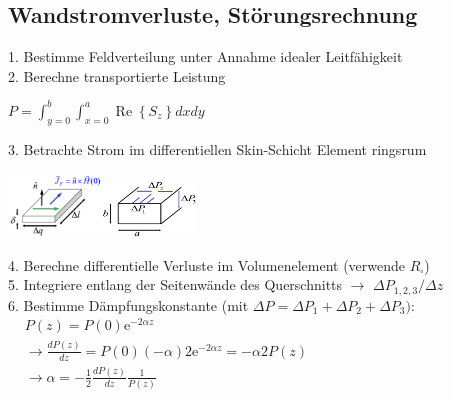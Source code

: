 \documentclass[english]{latex4ei/latex4ei_sheet}
\begin{document}
\begin{sectionbox}
	\subsection{Wandstromverluste, Störungsrechnung}
	1. Bestimme Feldverteilung unter Annahme idealer Leitfähigkeit\\
	2. Berechne transportierte Leistung\\
	\begin{emphbox}
		$P=\int_{y=0}^{b} \int_{x=0}^{a} \operatorname{Re}\left\{S_{z}\right\} d x d y$\\
	\end{emphbox}
	3. Betrachte Strom im differentiellen Skin-Schicht Element ringsrum
	\begin{center}\includegraphics[width = 2.5cm]{./img/verluste-hl.png}\includegraphics[width = 2.5cm]{./img/hl-verluste2.png}\end{center}
	4. Berechne differentielle Verluste im Volumenelement (verwende $R_{\square}$)\\
	5. Integriere entlang der Seitenwände des Querschnitts $\rightarrow$ $\Delta P_{1,2,3} / \Delta z$\\
	6. Bestimme Dämpfungskonstante (mit $\Delta P = \Delta P_{1}+\Delta P_{2}+\Delta P_{3})$:\\ 
	$\begin{aligned}
		&P(z)=P(0) \mathrm{e}^{-2 \alpha z} \\
		&\rightarrow \frac{d P(z)}{d z}=P(0)(-\alpha) 2 \mathrm{e}^{-2 \alpha z}=-\alpha 2 P(z) \\
		&\rightarrow \alpha=-\frac{1}{2} \frac{d P(z)}{d z} \frac{1}{P(z)}
		\end{aligned}$\\


\end{sectionbox}
\end{document}
